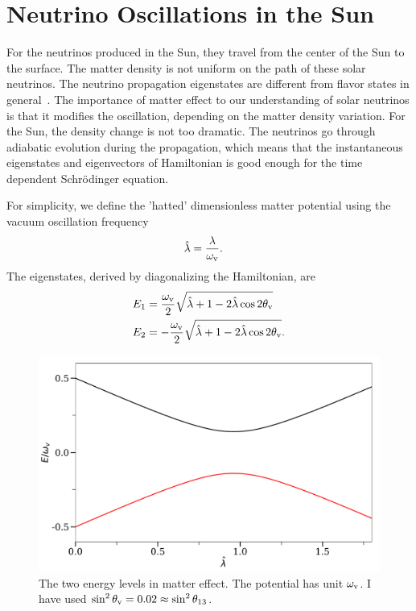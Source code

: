 \section{\label{chap:matter-sec:solar-neutrinos}Neutrino Oscillations in the Sun}



For the neutrinos produced in the Sun, they travel from the center of the Sun to the surface. The matter density is not uniform on the path of these solar neutrinos. The neutrino propagation eigenstates are different from flavor states in general~\cite{wolf78}. The importance of matter effect to our understanding of solar neutrinos is that it modifies the oscillation, depending on the matter density variation. For the Sun, the density change is not too dramatic. The neutrinos go through adiabatic evolution during the propagation, which means that the instantaneous eigenstates and eigenvectors of Hamiltonian is good enough for the time dependent Schr\"{o}dinger equation.

For simplicity, we define the 'hatted' dimensionless matter potential using the vacuum oscillation frequency
\begin{align}
\hat\lambda & = \frac{\lambda}{\omega_\mathrm v}.
\end{align}
The eigenstates, derived by diagonalizing the Hamiltonian, are
\begin{align}
E_1 &= \frac{\omega_\mathrm v}{2}\sqrt{ \hat\lambda +1 -  2\hat\lambda \cos 2\theta_\mathrm v }\\
E_2 &= -\frac{\omega_\mathrm v}{2}\sqrt{ \hat\lambda +1 -  2\hat\lambda \cos 2\theta_\mathrm v }.
\end{align}


\begin{figure}[htbp]
\centering
\includegraphics[width=0.7\columnwidth]{chapters/assets/matter/mswEnergyLevels}
\caption{The two energy levels in matter effect. The potential has unit $\omega_\mathrm v$. I have used $\sin^2\theta_\mathrm v = 0.02 \approx \sin^2 \theta_{13}$.}
\label{fig:mswEnergyLevels}
\end{figure}


